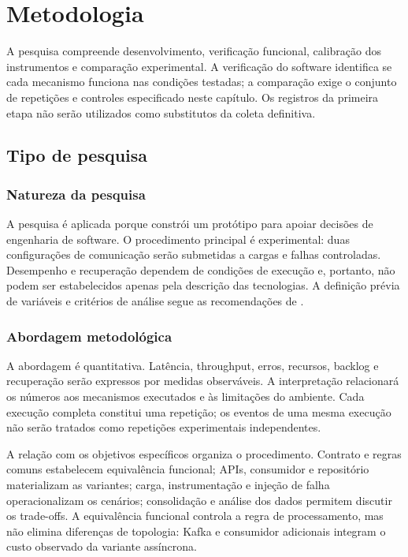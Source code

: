 \chapter{Metodologia}
\label{cap:metodo}

A pesquisa compreende desenvolvimento, verificação funcional, calibração dos instrumentos e comparação experimental. A verificação do software identifica se cada mecanismo funciona nas condições testadas; a comparação exige o conjunto de repetições e controles especificado neste capítulo. Os registros da primeira etapa não serão utilizados como substitutos da coleta definitiva.

\section{Tipo de pesquisa}

\subsection{Natureza da pesquisa}
A pesquisa é aplicada porque constrói um protótipo para apoiar decisões de engenharia de software. O procedimento principal é experimental: duas configurações de comunicação serão submetidas a cargas e falhas controladas. Desempenho e recuperação dependem de condições de execução e, portanto, não podem ser estabelecidos apenas pela descrição das tecnologias. A definição prévia de variáveis e critérios de análise segue as recomendações de .

\subsection{Abordagem metodológica}
A abordagem é quantitativa. Latência, throughput, erros, recursos, backlog e recuperação serão expressos por medidas observáveis. A interpretação relacionará os números aos mecanismos executados e às limitações do ambiente. Cada execução completa constitui uma repetição; os eventos de uma mesma execução não serão tratados como repetições experimentais independentes.

A relação com os objetivos específicos organiza o procedimento. Contrato e regras comuns estabelecem equivalência funcional; APIs, consumidor e repositório materializam as variantes; carga, instrumentação e injeção de falha operacionalizam os cenários; consolidação e análise dos dados permitem discutir os trade-offs. A equivalência funcional controla a regra de processamento, mas não elimina diferenças de topologia: Kafka e consumidor adicionais integram o custo observado da variante assíncrona.

